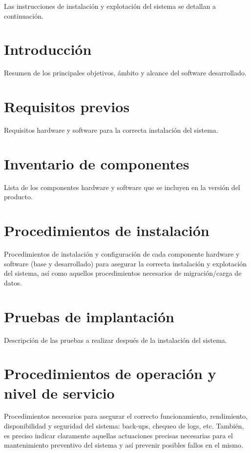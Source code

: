 

Las instrucciones de instalación y explotación del sistema se detallan a continuación.

\section{Introducción}
Resumen de los principales objetivos, ámbito y alcance del software desarrollado.

\section{Requisitos previos}
Requisitos hardware y software para la correcta instalación del sistema.

\section{Inventario de componentes}
Lista de los componentes hardware y software que se incluyen en la versión del producto.

\section{Procedimientos de instalación}
Procedimientos de instalación y configuración de cada componente hardware y software (base y desarrollado) para asegurar la correcta instalación y explotación del sistema, así como aquellos procedimientos necesarios de migración/carga de datos.

\section{Pruebas de implantación}
Descripción de las pruebas a realizar después de la instalación del sistema. 

\section{Procedimientos de operación y nivel de servicio}
Procedimientos necesarios para asegurar el correcto funcionamiento, rendimiento, disponibilidad y seguridad del sistema: back-ups, chequeo de logs, etc. También, es preciso indicar claramente aquellas actuaciones precisas necesarias para el mantenimiento preventivo del sistema y así prevenir posibles fallos en el mismo. 
